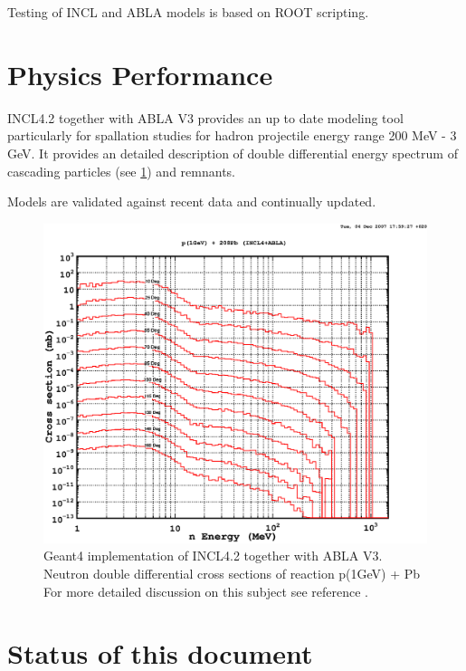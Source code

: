 Testing of INCL and ABLA models is based on ROOT \cite{Brun97a} scripting.

\section{Physics Performance}
INCL4.2 together with ABLA V3 provides an up to date modeling tool particularly for spallation
studies for hadron projectile energy range 200 MeV - 3 GeV. 
It provides an detailed description of double differential
energy spectrum of cascading particles (see \ref{fig:pPbDoubleDifferential}) and remnants.

Models are validated against recent data and continually updated.

\begin{figure}
\begin{center}
\includegraphics[angle=0,scale=0.65]{pPbDoubleDifferential.eps}
\end{center}
\caption{Geant4 implementation of INCL4.2 together with ABLA V3. Neutron double differential cross sections of reaction p(1GeV) + Pb
 For more detailed discussion on this subject
see reference \cite{Boudard02a}.}
\label{fig:pPbDoubleDifferential}
\end{figure}

\section{Status of this document}

